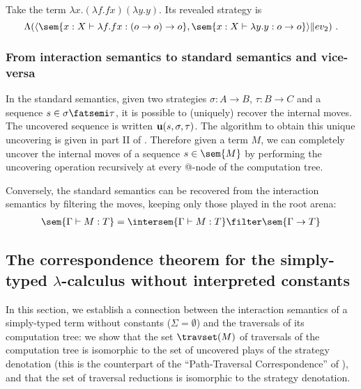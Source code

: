 \begin{example}
Take the term $\lambda x . (\lambda f . f x) (\lambda y . y)$.
Its revealed strategy is $$\Lambda ( \langle \sem{ x:X \vdash \lambda f . f
x : (o\rightarrow o) \rightarrow o} , \sem{ x:X \vdash \lambda y . y
: o \rightarrow o} \rangle \| ev_2 ) \ .$$
\end{example}


\subsubsection{From interaction semantics to standard semantics and vice-versa}

In the standard semantics, given two strategies $\sigma : A
\rightarrow B$, $\tau : B \rightarrow C$ and a sequence $s \in
\sigma \fatsemi \tau$, it is possible to (uniquely) recover the
internal moves. The uncovered sequence is written ${\bf u}(s,
\sigma, \tau)$. The algorithm to obtain this unique uncovering is
given in part II of \cite{hylandong_pcf}. Therefore given a term
$M$, we can completely uncover the internal moves of a sequence
$s\in\sem{M}$ by performing the uncovering operation recursively at
every @-node of the computation tree.

Conversely, the standard semantics can be recovered from the
interaction semantics by filtering the moves, keeping only those
played in the root arena:
\begin{eqnarray}
 \sem{\Gamma \vdash M : T} = \intersem{\Gamma \vdash M : T} \filter \sem{\Gamma \rightarrow T} \label{eqn:int_std_gamsem}
\end{eqnarray}

\subsection{The correspondence theorem for the simply-typed $\lambda$-calculus without interpreted constants}
In this section, we establish a connection between the interaction
semantics of a simply-typed term without constants ($\Sigma =
\emptyset$) and the traversals of its computation tree: we show that
the set $\travset(M)$ of traversals of the computation tree is
isomorphic to the set of uncovered plays of the strategy denotation
(this is the counterpart of the ``Path-Traversal Correspondence'' of
\cite{OngLics2006}), and that the set of traversal reductions is
isomorphic to the strategy denotation.


